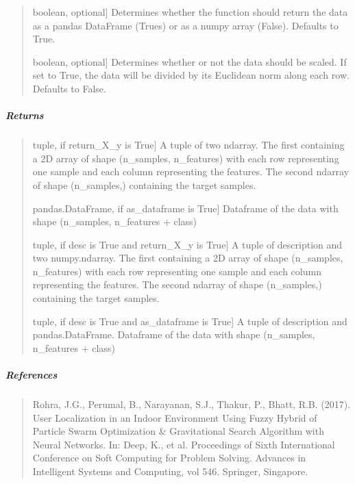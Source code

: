 \documentclass[letterpaper,10pt,english,openany,oneside]{sphinxmanual}
\begin{document}
\begin{fulllineitems}
\begin{quote}
\begin{description}
\sphinxlineitem{as\_dataframe}{[}boolean, optional{]}
\sphinxAtStartPar
Determines whether the function should return the data as a pandas DataFrame (Trues) 
or as a numpy array (False). Defaults to True.

\sphinxlineitem{scaled}{[}boolean, optional{]}
\sphinxAtStartPar
Determines whether or not the data should be scaled. If set to True, the data will be 
divided by its Euclidean norm along each row. Defaults to False.

\end{description}
\end{quote}


\subparagraph{Returns}
\label{\detokenize{api_reference/generated/QuadratiK.datasets.load_wireless_data:returns}}\begin{quote}
\begin{description}
\sphinxlineitem{(data, target)}{[}tuple, if return\_X\_y is True{]}
\sphinxAtStartPar
A tuple of two ndarray. The first containing a 2D array of shape
(n\_samples, n\_features) with each row representing one sample and
each column representing the features. The second ndarray of shape
(n\_samples,) containing the target samples.

\sphinxlineitem{data}{[}pandas.DataFrame, if as\_dataframe is True{]}
\sphinxAtStartPar
Dataframe of the data with shape (n\_samples, n\_features + class)

\sphinxlineitem{(desc, data, target)}{[}tuple, if desc is True and return\_X\_y is True{]}
\sphinxAtStartPar
A tuple of description and two numpy.ndarray. The first containing a 2D 
array of shape (n\_samples, n\_features) with each row representing 
one sample and each column representing the features. The second 
ndarray of shape (n\_samples,) containing the target samples.

\sphinxlineitem{(desc, data)}{[}tuple, if desc is True and as\_dataframe is True{]}
\sphinxAtStartPar
A tuple of description and pandas.DataFrame.
Dataframe of the data with shape (n\_samples, n\_features + class)

\end{description}
\end{quote}


\subparagraph{References}
\label{\detokenize{api_reference/generated/QuadratiK.datasets.load_wireless_data:references}}\begin{quote}

\sphinxAtStartPar
Rohra, J.G., Perumal, B., Narayanan, S.J., Thakur, P., Bhatt, R.B. (2017). 
User Localization in an Indoor Environment Using Fuzzy Hybrid of Particle Swarm Optimization 
\& Gravitational Search Algorithm with Neural Networks. In: Deep, K., et al. Proceedings of 
Sixth International Conference on Soft Computing for Problem Solving. Advances in Intelligent 
Systems and Computing, vol 546. Springer, Singapore. 
\end{quote}



\end{fulllineitems}
\end{document}
